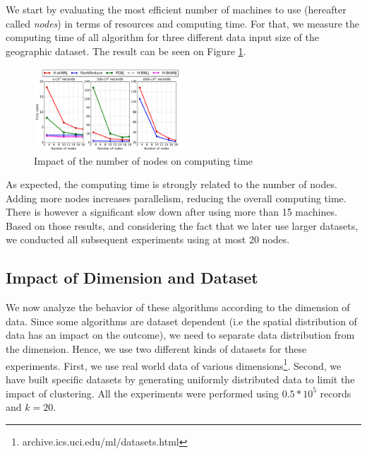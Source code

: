 We start by evaluating the most efficient number of machines to use (hereafter called \emph{nodes}) in terms of resources and computing 
time. For that, we measure the computing time of all algorithm for three different data input size of the geographic dataset.
The result can be seen on Figure \ref{fig:geo_data_nodes}.
\begin{figure}[!h]
 \centering
 \includegraphics[width=0.5\textwidth]{img-perf/geo/data/nodes.pdf}
 \caption{Impact of the number of nodes on computing time  \label{fig:geo_data_nodes}}
\end{figure}
As expected, the computing time is strongly related to the number of nodes. Adding more nodes increases parallelism, reducing the
overall computing time. There is however a significant slow down after using more than 15 machines. Based on those
results, and considering the fact that we later use larger datasets, we conducted all subsequent experiments using at 
most 20 nodes.






\subsection{Impact of Dimension and Dataset}
We now analyze the behavior of these algorithms according to the dimension of  data. Since 
some algorithms are dataset dependent (i.e the spatial distribution of data has an impact on 
the outcome), we need to separate data distribution from the dimension. Hence, we use two
different kinds of datasets for these experiments. First, we use real world data of various 
dimensions\footnote{archive.ics.uci.edu/ml/datasets.html}. Second, we have built specific datasets by generating 
uniformly distributed data to limit the impact of clustering. All the experiments were performed using 
$0.5*10^5$ records and $k=20$. 
 
